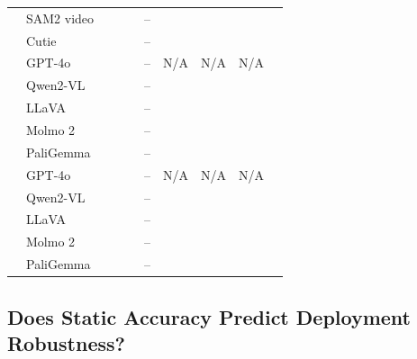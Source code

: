 \begin{table}[t]
{\begin{tabular}{llcccccccc}
\midrule
{}
 & SAM2 video           &  &  &  & -- &  &  &  &  \\
 & Cutie                &  &  &  & -- &  &  &  &  \\
\midrule
{}
 & GPT-4o               &  &  &  & -- & N/A & N/A & N/A &  \\
 & Qwen2-VL             &  &  &  & -- &  &  &  &  \\
 & LLaVA                &  &  &  & -- &  &  &  &  \\
 & Molmo 2              &  &  &  & -- &  &  &  &  \\
 & PaliGemma            &  &  &  & -- &  &  &  &  \\
\midrule
{}
 & GPT-4o               &  &  &  & -- & N/A & N/A & N/A &  \\
 & Qwen2-VL             &  &  &  & -- &  &  &  &  \\
 & LLaVA                &  &  &  & -- &  &  &  &  \\
 & Molmo 2              &  &  &  & -- &  &  &  &  \\
 & PaliGemma            &  &  &  & -- &  &  &  &  \\
\bottomrule
\end{tabular}%
}
\end{table}


\subsection{Does Static Accuracy Predict Deployment Robustness?}
\label{sec:robustness-inversion}

